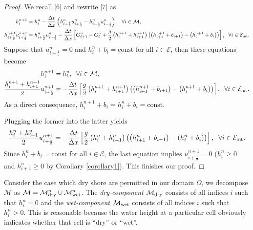 \documentclass[11pt,a4paper,center,notitlepage]{article}
\numberwithin{equation}{section}
\begin{document}
\begin{proof}
We recall \eqref{6} and rewrite \eqref{7} as 
\begin{align*}
h_i^{n + 1} &= h_i^n - \frac{{\Delta t}}{{\Delta x}}\left( {h_{i + \frac{1}{2}}^nu_{i + \frac{1}{2}}^n - h_{i - \frac{1}{2}}^nu_{i - \frac{1}{2}}^n} \right), \hspace{2mm} \forall i \in \mathcal{M},\\
\bar h_{i + \frac{1}{2}}^{n + 1}u_{i + \frac{1}{2}}^{n + 1} &= \bar h_{i + \frac{1}{2}}^nu_{i + \frac{1}{2}}^n - \frac{{\Delta t}}{{\Delta x}}\left[ {G_{i + 1}^n - G_i^n + \frac{g}{2}\left( {h_i^{n + 1} + h_{i + 1}^{n + 1}} \right)\left( {\left( {h_{i + 1}^{n + 1} + {b_{i + 1}}} \right) - \left( {h_i^{n + 1} + {b_i}} \right)} \right)} \right], \hspace{2mm} \forall i \in {\mathcal{E}_{{\mathop{\rm int}} }}.
\end{align*}
Suppose that $u_{i+\frac{1}{2}}^n=0$ and $h_i^n + b_i = \mbox{const}$ for all $i\in \mathcal{E}$, then these equations become
\begin{align}
\nonumber
h_i^{n + 1} &= h_i^n, \hspace{2mm} \forall i \in \mathcal{M},\\
\frac{{h_i^{n + 1} + h_{i + 1}^{n + 1}}}{2}u_{i + \frac{1}{2}}^{n + 1} &=  - \frac{{\Delta t}}{{\Delta x}}\left[ {\frac{g}{2}\left( {h_i^{n + 1} + h_{i + 1}^{n + 1}} \right)\left( {\left( {h_{i + 1}^{n + 1} + {b_{i + 1}}} \right) - \left( {h_i^{n + 1} + {b_i}} \right)} \right)} \right], \hspace{2mm} \forall i \in {\mathcal{E}_{\rm int}}. \label{17}
\end{align}
As a direct consequence, $h_i^{n+1} + b_i = h_i^n + b_i = \mbox{const}$. 

Plugging the former into the latter yields
\begin{align*}
\frac{{h_i^n + h_{i + 1}^n}}{2}u_{i + \frac{1}{2}}^{n + 1} =  - \frac{{\Delta t}}{{\Delta x}}\left[ {\frac{g}{2}\left( {h_i^n + h_{i + 1}^n} \right)\left( {\left( {h_{i + 1}^n + {b_{i + 1}}} \right) - \left( {h_i^n + {b_i}} \right)} \right)} \right], \hspace{2mm} \forall i \in {\mathcal{E}_{\rm int}}.
\end{align*}
Since $h_i^n + b_i = \mbox{const}$ for all $i\in \mathcal{E}$, the last equation implies $u_{i + \frac{1}{2}}^{n + 1} = 0$ ($h_i^n \ge 0$ and $h_{i+1}^n \ge 0$ by Corollary \ref{corollary1}). This finishes our proof.
\end{proof}
Consider the case which dry shore are permitted in our domain $\Omega$, we decompose $\mathcal{M}$ as $\mathcal{M} = {\mathcal{M}_{\rm dry}^n} \cup {\mathcal{M}_{\rm wet}^n}$. The \textit{dry-component} $\mathcal{M}_{\rm dry}$ consists of all indices $i$ such that $h_i^n =0$ and the \textit{wet-component} $\mathcal{M}_{\rm wet}$ consists of all indices $i$ such that $h_i^n >0$. This is reasonable because the water height at a particular cell obviously indicates whether that cell is ``dry'' or ``wet''.
\end{document}
